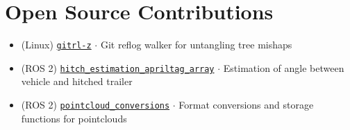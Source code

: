 \documentclass[a4paper,10pt,twoside]{article}
\begin{document}
\verticalspacebetweensections

\section{\textbf{Open Source Contributions}}\verticalspacebetweensectionandcontent

  \noindent\begin{minipage}[t]{\textwidth}
    \begin{itemize}
      \item (Linux) \href{https://github.com/li9i/gitrl-z}{\texttt{gitrl-z}} $\cdot$ Git reflog walker for untangling tree mishaps\verticalspaceafteritem
      \item (ROS 2) \href{https://index.ros.org/p/hitch_estimation_apriltag_array/#humble}{\texttt{hitch\_estimation\_apriltag\_array}} $\cdot$ Estimation of angle between vehicle and hitched trailer \verticalspaceafteritem
      \item (ROS 2) \href{https://index.ros.org/r/pointcloud_conversions/#lyrical}{\texttt{pointcloud\_conversions}} $\cdot$ Format conversions and storage functions for pointclouds
    \end{itemize}
  \end{minipage} \\ [0.2em]

\verticalspacebetweensections

\end{document}
